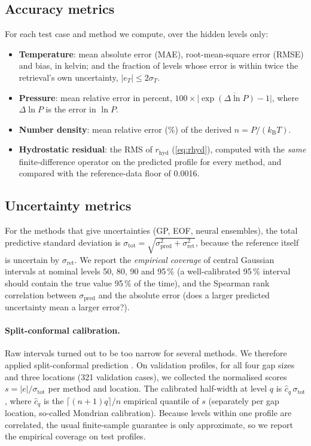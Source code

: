 \documentclass[11pt,a4paper]{article}
\newcommand{\kB}{k_{\mathrm{B}}}
\newcommand{\rhyd}{r_{\mathrm{hyd}}}
\begin{document}
\subsection{Accuracy metrics}
For each test case and method we compute, over the hidden levels only:
\begin{itemize}[leftmargin=*]
\item \textbf{Temperature}: mean absolute error (MAE), root-mean-square error (RMSE) and bias, in kelvin; and the fraction of levels whose error is within twice the retrieval's own uncertainty, $|e_T|\le2\sigma_T$.
\item \textbf{Pressure}: mean relative error in percent, $100\times\overline{|\exp(\Delta\ln P)-1|}$, where $\Delta\ln P$ is the error in $\ln P$.
\item \textbf{Number density}: mean relative error (\%) of the derived $n=P/(\kB T)$.
\item \textbf{Hydrostatic residual}: the RMS of $\rhyd$ (\cref{eq:rhyd}), computed with the \emph{same} finite-difference operator on the predicted profile for every method, and compared with the reference-data floor of 0.0016.
\end{itemize}

\subsection{Uncertainty metrics}\label{sec:conformal}
For the methods that give uncertainties (GP, EOF, neural ensembles), the total predictive standard deviation is $\sigma_{\mathrm{tot}}=\sqrt{\sigma_{\mathrm{pred}}^2+\sigma_{\mathrm{ret}}^2}$, because the reference itself is uncertain by $\sigma_{\mathrm{ret}}$. We report the \emph{empirical coverage} of central Gaussian intervals at nominal levels 50, 80, 90 and 95\,\% (a well-calibrated 95\,\% interval should contain the true value 95\,\% of the time), and the Spearman rank correlation between $\sigma_{\mathrm{pred}}$ and the absolute error (does a larger predicted uncertainty mean a larger error?).

\paragraph{Split-conformal calibration.} Raw intervals turned out to be too narrow for several methods. We therefore applied split-conformal prediction \citep{vovk2005,angelopoulos2023}. On validation profiles, for all four gap sizes and three locations (321 validation cases), we collected the normalised scores $s=|e|/\sigma_{\mathrm{tot}}$ per method and location. The calibrated half-width at level $q$ is $\hat c_q\,\sigma_{\mathrm{tot}}$, where $\hat c_q$ is the $\lceil(n+1)q\rceil/n$ empirical quantile of $s$ (separately per gap location, so-called Mondrian calibration). Because levels within one profile are correlated, the usual finite-sample guarantee is only approximate, so we report the empirical coverage on test profiles.
\end{document}
